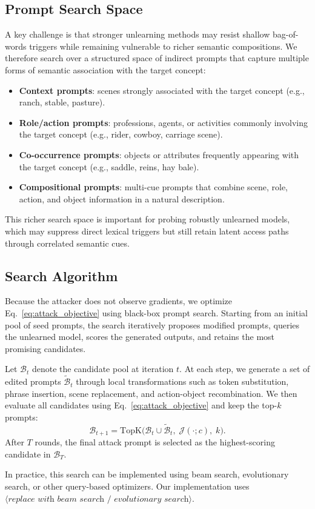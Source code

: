\subsection{Prompt Search Space}
\label{subsec:prompt_space}

A key challenge is that stronger unlearning methods may resist shallow bag-of-words triggers while remaining vulnerable to richer semantic compositions. We therefore search over a structured space of indirect prompts that capture multiple forms of semantic association with the target concept:
\begin{itemize}
    \item \textbf{Context prompts}: scenes strongly associated with the target concept (e.g., ranch, stable, pasture).
    \item \textbf{Role/action prompts}: professions, agents, or activities commonly involving the target concept (e.g., rider, cowboy, carriage scene).
    \item \textbf{Co-occurrence prompts}: objects or attributes frequently appearing with the target concept (e.g., saddle, reins, hay bale).
    \item \textbf{Compositional prompts}: multi-cue prompts that combine scene, role, action, and object information in a natural description.
\end{itemize}

This richer search space is important for probing robustly unlearned models, which may suppress direct lexical triggers but still retain latent access paths through correlated semantic cues.

\subsection{Search Algorithm}
\label{subsec:search_algorithm}

Because the attacker does not observe gradients, we optimize Eq.~\ref{eq:attack_objective} using black-box prompt search. Starting from an initial pool of seed prompts, the search iteratively proposes modified prompts, queries the unlearned model, scores the generated outputs, and retains the most promising candidates.

Let $\mathcal{B}_t$ denote the candidate pool at iteration $t$. At each step, we generate a set of edited prompts $\widetilde{\mathcal{B}}_t$ through local transformations such as token substitution, phrase insertion, scene replacement, and action-object recombination. We then evaluate all candidates using Eq.~\ref{eq:attack_objective} and keep the top-$k$ prompts:
\begin{equation}
\mathcal{B}_{t+1} = \mathrm{TopK}\bigl(\mathcal{B}_t \cup \widetilde{\mathcal{B}}_t,\; \mathcal{J}(\cdot;c),\; k\bigr).
\end{equation}
After $T$ rounds, the final attack prompt is selected as the highest-scoring candidate in $\mathcal{B}_T$.

In practice, this search can be implemented using beam search, evolutionary search, or other query-based optimizers. Our implementation uses $\langle \textit{replace with beam search / evolutionary search} \rangle$.
